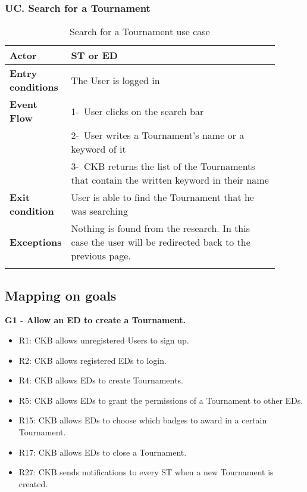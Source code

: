 \subsubsection*{UC\cuc . Search for a Tournament}
\begin{center}
    \begin{longtable}{|l|p{0.9\linewidth}|}
        \hline
        \textbf{Actor}            & ST or ED                                                                                                                                                                                       \\
        \hline
        \textbf{Entry conditions} & The User is logged in  \\
        \hline
        \textbf{Event Flow}       & 1-\ User clicks on the search bar        \\
        & 2-\ User writes a Tournament's name or a keyword of it \\
        & 3-\ CKB returns the list of the Tournaments that contain the written keyword in their name         \\
        \hline
        \textbf{Exit condition}   & User is able to find the Tournament that he was searching        \\
        \hline
        \textbf{Exceptions}        & Nothing is found from the research. In this case the user will be redirected back to the previous page.\\%
        \hline
        \caption{Search for a Tournament use case}
        \label{tab: search_for_a_Tournament_use_case}
    \end{longtable}
\end{center}


\subsection{Mapping on goals}
\label{subsec:mapping_on_goals}%
\textbf{G1 - Allow an ED to create a Tournament.}
\begin{itemize}
    \item R1: CKB allows unregistered Users to sign up.
    \item R2: CKB allows registered EDs to login.
    \item R4: CKB allows EDs to create Tournaments.
    \item R5: CKB allows EDs to grant the permissions of a Tournament to other EDs.
    \item R15: CKB allows EDs to choose which badges to award in a certain Tournament.
    \item R17: CKB allows EDs to close a Tournament.
    \item R27: CKB sends notifications to every ST when a new Tournament is created.
\end{itemize}

